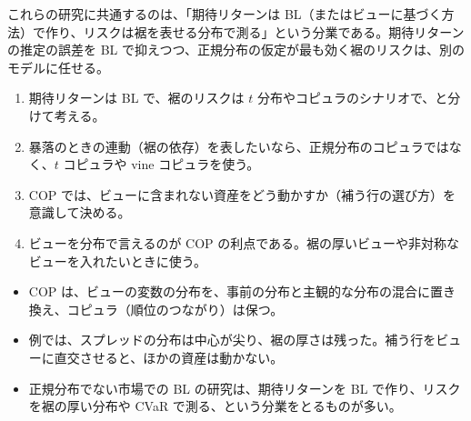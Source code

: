 これらの研究に共通するのは、「期待リターンは BL（またはビューに基づく方法）で作り、リスクは裾を表せる分布で測る」という分業である。期待リターンの推定の誤差を BL で抑えつつ、正規分布の仮定が最も効く裾のリスクは、別のモデルに任せる。

\begin{tipbox}[コツ：正規分布でない市場]
\begin{enumerate}
\item 期待リターンは BL で、裾のリスクは $t$ 分布やコピュラのシナリオで、と分けて考える。
\item 暴落のときの連動（裾の依存）を表したいなら、正規分布のコピュラではなく、$t$ コピュラや vine コピュラを使う。
\item COP では、ビューに含まれない資産をどう動かすか（補う行の選び方）を意識して決める。
\item ビューを分布で言えるのが COP の利点である。裾の厚いビューや非対称なビューを入れたいときに使う。
\end{enumerate}
\end{tipbox}

\begin{keybox}[この章のまとめ]
\begin{itemize}
\item COP は、ビューの変数の分布を、事前の分布と主観的な分布の混合に置き換え、コピュラ（順位のつながり）は保つ。
\item 例では、スプレッドの分布は中心が尖り、裾の厚さは残った。補う行をビューに直交させると、ほかの資産は動かない。
\item 正規分布でない市場での BL の研究は、期待リターンを BL で作り、リスクを裾の厚い分布や CVaR で測る、という分業をとるものが多い。
\end{itemize}
\end{keybox}
